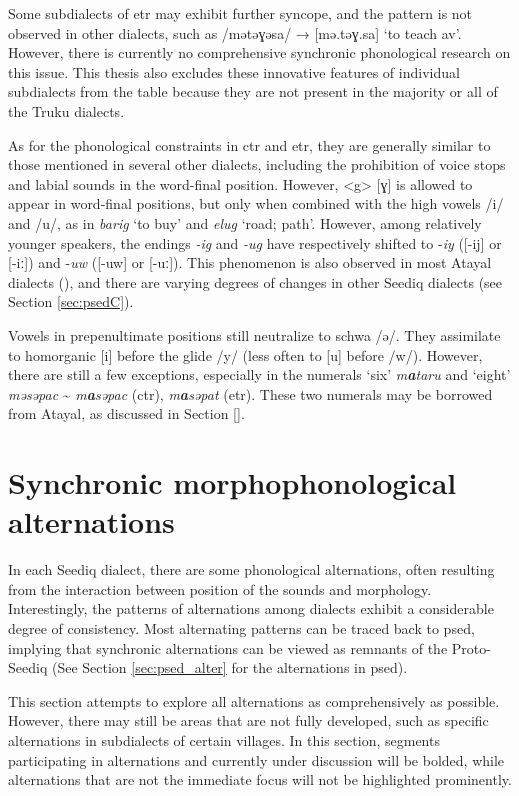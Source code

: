 Some subdialects of \acl{etr} may exhibit further syncope, and the pattern is not observed in other dialects, such as /mətəɣəsa/ → [mə.təɣ.sa] `to teach \acs{av}'. However, there is currently no comprehensive synchronic phonological research on this issue. This thesis also excludes these innovative features of individual subdialects from the table because they are not present in the majority or all of the Truku dialects.

As for the phonological constraints in \acl{ctr} and \acl{etr}, they are generally similar to those mentioned in several other dialects, including the prohibition of voice stops and labial sounds in the word-final position. However, <g> [ɣ] is allowed to appear in word-final positions, but only when combined with the high vowels /i/ and /u/, as in \textit{barig} `to buy' and \textit{elug} `road; path'. However, among relatively younger speakers, the endings \textit{-ig} and \textit{-ug} have respectively shifted to -\textit{iy} ([-ij] or [-iː]) and -\textit{uw} ([-uw] or [-uː]). This phenomenon is also observed in most Atayal dialects (\cite{li1982aicage,goderich2020phd}), and there are varying degrees of changes in other Seediq dialects (see Section \ref{sec:psedC}).

Vowels in prepenultimate positions still neutralize to schwa /ə/. They assimilate to homorganic [i] before the glide /y/ (less often to [u] before /w/). However, there are still a few exceptions, especially in the numerals `six' \textit{m\textbf{a}taru} and `eight' \textit{məsəpac} \~{} \textit{m\textbf{a}səpac} (\acs{ctr}), \textit{m\textbf{a}səpat} (\acs{etr}). These two numerals may be borrowed from Atayal, as discussed in Section \ref{}.

\section{Synchronic morphophonological alternations} \label{sec:3.2}

In each Seediq dialect, there are some phonological alternations, often resulting from the interaction between position of the sounds and morphology. Interestingly, the patterns of alternations among dialects exhibit a considerable degree of consistency. Most alternating patterns can be traced back to \acl{psed}, implying that synchronic alternations can be viewed as remnants of the Proto-Seediq (See Section \ref{sec:psed_alter} for the alternations in \acl{psed}).

This section attempts to explore all alternations as comprehensively as possible. However, there may still be areas that are not fully developed, such as specific alternations in subdialects of certain villages. In this section, segments participating in alternations and currently under discussion will be bolded, while alternations that are not the immediate focus will not be highlighted prominently. 

